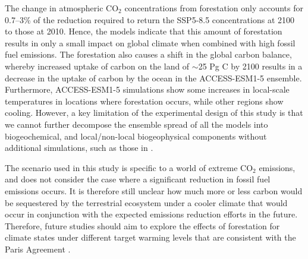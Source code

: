 \documentclass[draft]{agujournal2019}
\begin{document}
The change in atmospheric CO$_2$ concentrations from forestation only accounts for 0.7--3\% of the reduction required to return the SSP5-8.5 concentrations at 2100 to those at 2010.
Hence, the models indicate that this amount of forestation results in only a small impact on global climate when combined with high fossil fuel emissions.
The forestation also causes a shift in the global carbon balance, whereby increased uptake of carbon on the land of $\sim$25 Pg C by 2100 results in a decrease in the uptake of carbon by the ocean in the ACCESS-ESM1-5 ensemble.
Furthermore, ACCESS-ESM1-5 simulations show some increases in local-scale temperatures in locations where forestation occurs, while other regions show cooling.
However, a key limitation of the experimental design of this study is that we cannot further decompose the ensemble spread of all the models into biogeochemical, and local/non-local biogeophysical components without additional simulations, such as those in .

The scenario used in this study is specific to a world of extreme CO$_2$ emissions, and does not consider the case where a significant reduction in fossil fuel emissions occurs.
It is therefore still unclear how much more or less carbon would be sequestered by the terrestrial ecosystem under a cooler climate that would occur in conjunction with the expected emissions reduction efforts in the future.
Therefore, future studies should aim to explore the effects of forestation for climate states under different target warming levels that are consistent with the Paris Agreement \cite <for example>{king_studying_2021}.
\end{document}
